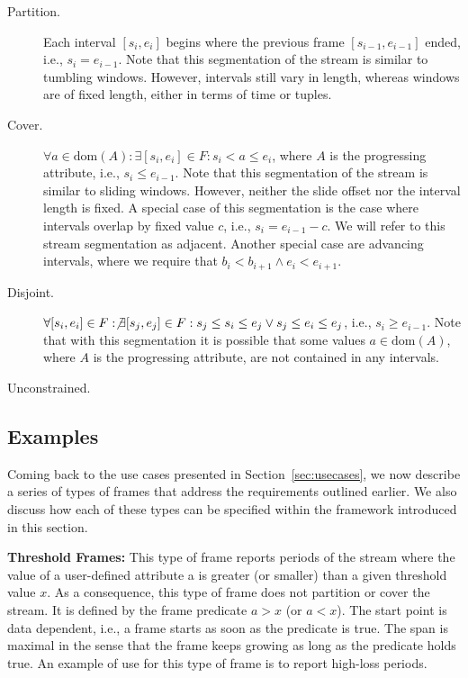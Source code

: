 \documentclass{vldb}
\begin{document}
\begin{description}

\item[Partition.] Each interval $[s_i,e_i]$ begins where the previous frame $[s_{i-1},e_{i-1}]$ ended, i.e., $s_i = e_{i-1}$. Note that this segmentation of the stream is similar to tumbling windows. However, intervals still vary in length, whereas windows are of fixed length, either in terms of time or tuples.

\item[Cover.] $\forall a \in \text{dom}(A): \exists [s_i,e_i] \in F: s_i < a \leq e_i$, where $A$ is the progressing attribute, i.e., $s_i \leq e_{i-1}$. Note that this segmentation of the stream is similar to sliding windows. However, neither the slide offset nor the interval length is fixed. A special case of this segmentation is the case where intervals overlap by fixed value $c$, i.e., $s_i = e_{i-1}-c$. We will refer to this stream segmentation as adjacent. Another special case are advancing intervals, where we require that $b_i < b_{i+1} \wedge e_i < e_{i+1}$.

\item[Disjoint.] $\forall [s_i,e_i] \in F: \not\exists [s_j,e_j] \in F: s_j \leq s_i \leq e_j \vee s_j \leq e_i \leq e_j$, i.e., $s_i \geq e_{i-1}$. Note that with this segmentation it is possible that some values $a \in \text{dom}(A)$, where $A$ is the progressing attribute, are not contained in any intervals.

\item[Unconstrained.]

\end{description}

\subsection{Examples}

Coming back to the use cases presented in Section~\ref{sec:usecases}, we now describe a series of types of frames that address the requirements outlined earlier. We also discuss how each of these types can be specified within the framework introduced in this section.

\textbf{Threshold Frames:} This type of frame reports periods of the stream where the value of a user-defined attribute a is greater (or smaller) than a given threshold value $x$. As a consequence, this type of frame does not partition or cover the stream. It is defined by the frame predicate $a>x$ (or $a<x$). The start point is data dependent, i.e., a frame starts as soon as the predicate is true. The span is maximal in the sense that the frame keeps growing as long as the predicate holds true. An example of use for this type of frame is to report high-loss periods.
\end{document}
